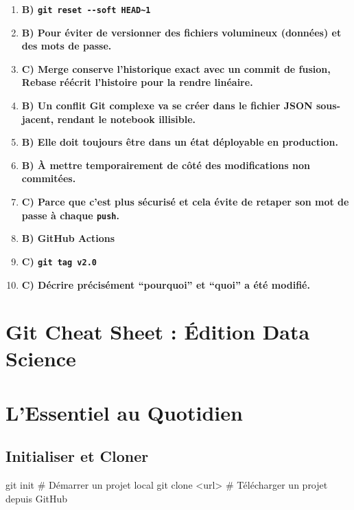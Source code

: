 \documentclass[
  letterpaper,
  DIV=11,
  numbers=noendperiod]{scrreprt}
\newenvironment{Shaded}{\begin{snugshade}}{\end{snugshade}}
\newcommand{\CommentTok}[1]{\textcolor[rgb]{0.37,0.37,0.37}{#1}}
\newcommand{\FunctionTok}[1]{\textcolor[rgb]{0.28,0.35,0.67}{#1}}
\newcommand{\NormalTok}[1]{\textcolor[rgb]{0.00,0.23,0.31}{#1}}
\newcommand{\OperatorTok}[1]{\textcolor[rgb]{0.37,0.37,0.37}{#1}}
\providecommand{\tightlist}{%
  \setlength{\itemsep}{0pt}\setlength{\parskip}{0pt}}
\begin{document}
\begin{enumerate}
\def\labelenumi{\arabic{enumi}.}
\tightlist
\item
  \textbf{B) \texttt{git\ reset\ -\/-soft\ HEAD\textasciitilde{}1}}
\item
  \textbf{B) Pour éviter de versionner des fichiers volumineux (données)
  et des mots de passe.}
\item
  \textbf{C) Merge conserve l'historique exact avec un commit de fusion,
  Rebase réécrit l'histoire pour la rendre linéaire.}
\item
  \textbf{B) Un conflit Git complexe va se créer dans le fichier JSON
  sous-jacent, rendant le notebook illisible.}
\item
  \textbf{B) Elle doit toujours être dans un état déployable en
  production.}
\item
  \textbf{B) À mettre temporairement de côté des modifications non
  commitées.}
\item
  \textbf{C) Parce que c'est plus sécurisé et cela évite de retaper son
  mot de passe à chaque \texttt{push}.}
\item
  \textbf{B) GitHub Actions}
\item
  \textbf{C) \texttt{git\ tag\ v2.0}}
\item
  \textbf{C) Décrire précisément ``pourquoi'' et ``quoi'' a été
  modifié.}
\end{enumerate}


\section{Git Cheat Sheet : Édition Data
Science}\label{git-cheat-sheet-uxe9dition-data-science}


\section{L'Essentiel au Quotidien}\label{lessentiel-au-quotidien}

\subsection{Initialiser et Cloner}\label{initialiser-et-cloner}

\begin{Shaded}
\begin{Highlighting}[]
\FunctionTok{git}\NormalTok{ init        }\CommentTok{\# Démarrer un projet local}
\FunctionTok{git}\NormalTok{ clone }\OperatorTok{\textless{}}\NormalTok{url}\OperatorTok{\textgreater{}} \CommentTok{\# Télécharger un projet depuis GitHub}
\end{Highlighting}
\end{Shaded}
\end{document}
